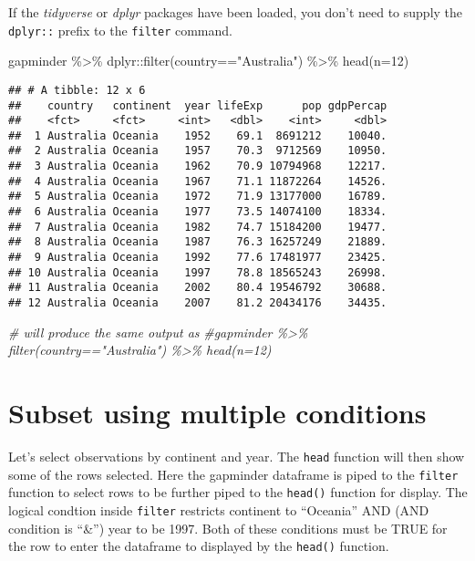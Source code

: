 \documentclass[
]{book}
\newenvironment{Shaded}{\begin{snugshade}}{\end{snugshade}}
\newcommand{\AttributeTok}[1]{\textcolor[rgb]{0.77,0.63,0.00}{#1}}
\newcommand{\CommentTok}[1]{\textcolor[rgb]{0.56,0.35,0.01}{\textit{#1}}}
\newcommand{\DecValTok}[1]{\textcolor[rgb]{0.00,0.00,0.81}{#1}}
\newcommand{\FunctionTok}[1]{\textcolor[rgb]{0.00,0.00,0.00}{#1}}
\newcommand{\NormalTok}[1]{#1}
\newcommand{\SpecialCharTok}[1]{\textcolor[rgb]{0.00,0.00,0.00}{#1}}
\newcommand{\StringTok}[1]{\textcolor[rgb]{0.31,0.60,0.02}{#1}}
\begin{document}
If the \emph{tidyverse} or \emph{dplyr} packages have been loaded, you don't need to supply the \texttt{dplyr::} prefix to the \texttt{filter} command.

\begin{Shaded}
\begin{Highlighting}[]
\NormalTok{gapminder }\SpecialCharTok{\%\textgreater{}\%}\NormalTok{ dplyr}\SpecialCharTok{::}\FunctionTok{filter}\NormalTok{(country}\SpecialCharTok{==}\StringTok{"Australia"}\NormalTok{) }\SpecialCharTok{\%\textgreater{}\%} \FunctionTok{head}\NormalTok{(}\AttributeTok{n=}\DecValTok{12}\NormalTok{)}
\end{Highlighting}
\end{Shaded}

\begin{verbatim}
## # A tibble: 12 x 6
##    country   continent  year lifeExp      pop gdpPercap
##    <fct>     <fct>     <int>   <dbl>    <int>     <dbl>
##  1 Australia Oceania    1952    69.1  8691212    10040.
##  2 Australia Oceania    1957    70.3  9712569    10950.
##  3 Australia Oceania    1962    70.9 10794968    12217.
##  4 Australia Oceania    1967    71.1 11872264    14526.
##  5 Australia Oceania    1972    71.9 13177000    16789.
##  6 Australia Oceania    1977    73.5 14074100    18334.
##  7 Australia Oceania    1982    74.7 15184200    19477.
##  8 Australia Oceania    1987    76.3 16257249    21889.
##  9 Australia Oceania    1992    77.6 17481977    23425.
## 10 Australia Oceania    1997    78.8 18565243    26998.
## 11 Australia Oceania    2002    80.4 19546792    30688.
## 12 Australia Oceania    2007    81.2 20434176    34435.
\end{verbatim}

\begin{Shaded}
\begin{Highlighting}[]
\CommentTok{\# will produce the same output as}
\CommentTok{\#gapminder \%\textgreater{}\% filter(country=="Australia") \%\textgreater{}\% head(n=12)}
\end{Highlighting}
\end{Shaded}

\hypertarget{subset-using-multiple-conditions}{%
\section{Subset using multiple conditions}\label{subset-using-multiple-conditions}}

Let's select observations by continent and year. The \texttt{head} function will then show some of the rows selected. Here the gapminder dataframe is piped to the \texttt{filter} function to select rows to be further piped to the \texttt{head()} function for display. The logical condtion inside \texttt{filter} restricts continent to ``Oceania'' AND (AND condition is ``\&'') year to be 1997. Both of these conditions must be TRUE for the row to enter the dataframe to displayed by the \texttt{head()} function.
\end{document}
